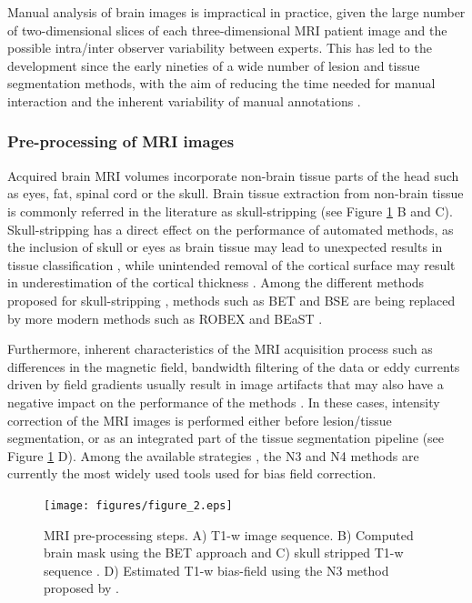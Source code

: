 Manual analysis of brain images is impractical in practice, given the large number of two-dimensional slices of each three-dimensional MRI patient image and the possible intra/inter observer variability between experts. This has led to the development since the early nineties of a wide number of lesion and tissue segmentation methods, with the aim of reducing the time needed for  manual interaction and the inherent variability of manual annotations \cite{Cline1990, Gerig1992, Kapur1996}.


\subsubsection{Pre-processing of MRI images}
Acquired brain MRI volumes incorporate non-brain tissue parts of the head such as eyes, fat, spinal cord or the skull. Brain tissue extraction from non-brain tissue is commonly referred in the literature as skull-stripping (see Figure \ref{preprocessing_mri} B and C). Skull-stripping has a direct effect on the performance of automated methods, as the inclusion of skull or eyes as brain tissue may lead to unexpected results in tissue classification \cite{Acosta-Cabronero2008, Popescu2012}, while unintended removal of the cortical surface may result in underestimation of the cortical thickness \cite{Sadananthan2010}. Among the different methods proposed for skull-stripping \cite{Acosta-Cabronero2008, Lee2003, Roura2014}, methods such as BET \cite{Smith2002} and BSE \cite{Shattuck2001} are being replaced by more modern methods such as ROBEX \cite{Iglesias2011} and BEaST \cite{Eskildsen2012}.

Furthermore, inherent characteristics of the MRI acquisition process such as differences in the magnetic field, bandwidth filtering of the data or eddy currents driven by field gradients usually result in image artifacts that may also have a negative impact on the performance of the methods \cite{Simmons1994}. In these cases, intensity correction of the MRI images is performed either before lesion/tissue segmentation, or as an integrated part of the tissue segmentation pipeline  (see Figure \ref{preprocessing_mri} D). Among the available strategies \cite{Arnold2001,Hou2006}, the N3 \cite{Sled1998} and N4 \cite{Tustison2010} methods are currently the most widely used tools used for bias field correction. 


\begin{figure}[top]
  \begin{center}
    \texttt{[image: figures/figure\_2.eps]}
  \end{center}
    \caption[MRI pre-processing steps]{MRI pre-processing steps. A) T1-w image sequence. B) Computed brain mask using the BET approach \cite{Smith2002} and C) skull stripped T1-w sequence  . D) Estimated T1-w bias-field using the N3 method proposed by \cite{Sled1998}.}
    \label{preprocessing_mri}
\end{figure}

